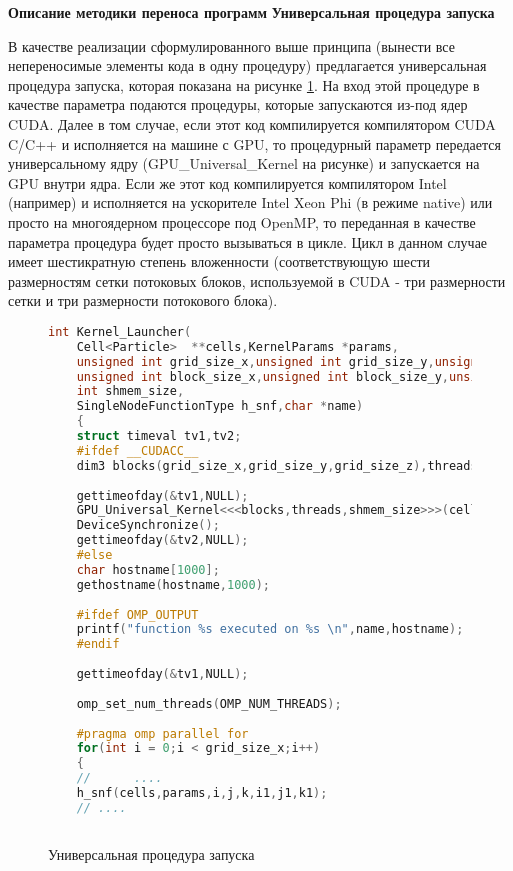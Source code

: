 \textbf{Описание методики переноса программ}
\textbf{Универсальная процедура запуска}

В качестве реализации сформулированного выше принципа (вынести все непереносимые элементы кода в одну процедуру) предлагается универсальная процедура запуска, которая показана на рисунке \ref{universal-launcher}. На вход этой процедуре в качестве параметра подаются процедуры, которые запускаются из-под ядер CUDA. Далее в том случае, если этот код компилируется компилятором CUDA C/C++ и исполняется на машине с GPU, то процедурный параметр передается универсальному ядру (GPU\_Universal\_Kernel на рисунке) и запускается на GPU внутри ядра. Если же этот код компилируется компилятором Intel (например) и исполняется
на ускорителе Intel Xeon Phi (в режиме native) или просто на многоядерном процессоре под OpenMP, то переданная в качестве параметра процедура будет просто вызываться в цикле. Цикл в данном случае имеет шестикратную степень вложенности (соответствующую шести размерностям сетки потоковых блоков, используемой в CUDA - три размерности сетки и три размерности потокового блока).
\begin{figure}[h]
	\begin{lstlisting}[language=c]
	int Kernel_Launcher(
	Cell<Particle>  **cells,KernelParams *params,
	unsigned int grid_size_x,unsigned int grid_size_y,unsigned int grid_size_z,
	unsigned int block_size_x,unsigned int block_size_y,unsigned int block_size_z,
	int shmem_size,
	SingleNodeFunctionType h_snf,char *name)
	{
	struct timeval tv1,tv2;
	#ifdef __CUDACC__
	dim3 blocks(grid_size_x,grid_size_y,grid_size_z),threads(block_size_x,block_size_y,block_size_z);
	
	gettimeofday(&tv1,NULL);
	GPU_Universal_Kernel<<<blocks,threads,shmem_size>>>(cells,params,h_snf);
	DeviceSynchronize();
	gettimeofday(&tv2,NULL);
	#else
	char hostname[1000];
	gethostname(hostname,1000);
	
	#ifdef OMP_OUTPUT
	printf("function %s executed on %s \n",name,hostname);
	#endif
	
	gettimeofday(&tv1,NULL);
	
	omp_set_num_threads(OMP_NUM_THREADS);
	
	#pragma omp parallel for
	for(int i = 0;i < grid_size_x;i++)
	{
	//      ....              
	h_snf(cells,params,i,j,k,i1,j1,k1);
	// ....
	
	\end{lstlisting}
	\caption{Универсальная процедура запуска}
	\label{universal-launcher}
\end{figure}

